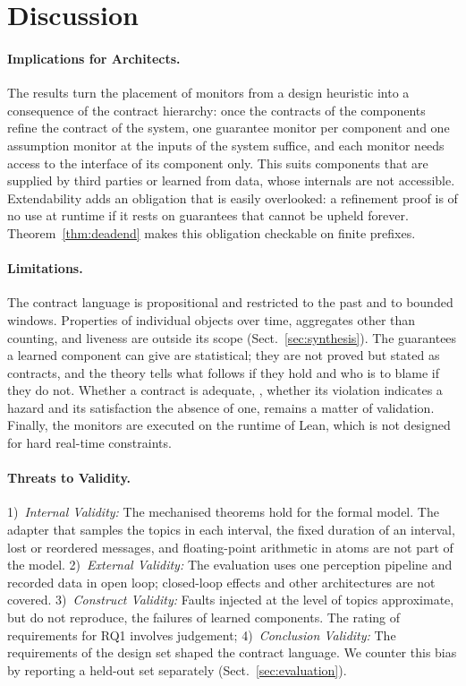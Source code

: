 \section{Discussion}\label{sec:discussion}

\paragraph{Implications for Architects.} The results turn the placement of monitors from a design heuristic into a consequence of the contract hierarchy: once the contracts of the components refine the contract of the system, one guarantee monitor per component and one assumption monitor at the inputs of the system suffice, and each monitor needs access to the interface of its component only. This suits components that are supplied by third parties or learned from data, whose internals are not accessible. Extendability adds an obligation that is easily overlooked: a refinement proof is of no use at runtime if it rests on guarantees that cannot be upheld forever. Theorem~\ref{thm:deadend} makes this obligation checkable on finite prefixes.

\paragraph{Limitations.} The contract language is propositional and restricted to the past and to bounded windows. Properties of individual objects over time, aggregates other than counting, and liveness are outside its scope (Sect.~\ref{sec:synthesis}). The guarantees a learned component can give are statistical; they are not proved but stated as contracts, and the theory tells what follows if they hold and who is to blame if they do not. Whether a contract is adequate, \ie, whether its violation indicates a hazard and its satisfaction the absence of one, remains a matter of validation. Finally, the monitors are executed on the runtime of Lean, which is not designed for hard real-time constraints.

\paragraph{Threats to Validity.} 1)~\emph{Internal Validity:} The mechanised theorems hold for the formal model. The adapter that samples the topics in each interval, the fixed duration of an interval, lost or reordered messages, and floating-point arithmetic in atoms are not part of the model.  2)~\emph{External Validity:} The evaluation uses one perception pipeline and recorded data in open loop; closed-loop effects and other architectures are not covered. 3)~\emph{Construct Validity:} Faults injected at the level of topics approximate, but do not reproduce, the failures of learned components. The rating of requirements for RQ1 involves judgement;  4)~\emph{Conclusion Validity:} The requirements of the design set shaped the contract language. We counter this bias by reporting a held-out set separately (Sect.~\ref{sec:evaluation}).

